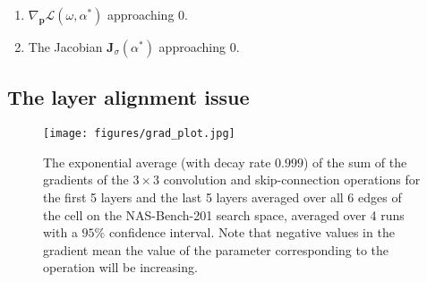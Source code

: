 \documentclass{article} \usepackage{fancyhdr, iclr2023_conference, times}
\def\vp{{\bm{p}}}
\def\mJ{{\bm{J}}}
\newcommand{\lambdafn}{layer alignment\xspace}
\begin{document}
\begin{enumerate}
    \item $\nabla_\vp \mathcal{L}(\omega, \alpha^*)$ approaching $0$.
    \item The Jacobian $\mJ_\sigma(\alpha^*)$ approaching $0$.
\end{enumerate}
\subsection{The \lambdafn issue}
\label{sec:wsi}
\begin{figure}[t]
    \vspace{-10pt}
    \centering
    \texttt{[image: figures/grad\_plot.jpg]}
    \vspace{-5pt}
    \caption{The exponential average (with decay rate $0.999$) of the sum of the gradients of the $3\times3$ convolution and skip-connection operations for the first 5 layers and the last 5 layers averaged over all 6 edges of the cell on the NAS-Bench-201 search space, averaged over 4 runs with a $95\%$ confidence interval. Note that negative values in the gradient mean the value of the parameter corresponding to the operation will be increasing.}
    \label{fig:grads-b}
    \vspace{-10pt}
\end{figure}
\end{document}
